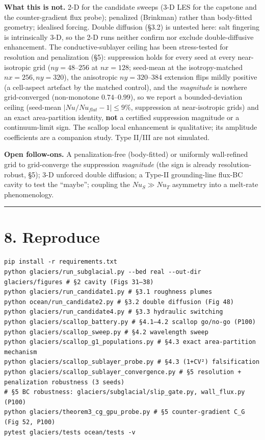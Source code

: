 \documentclass[11pt]{article}
\begin{document}
\textbf{What this is not.} 2-D for the candidate sweeps (3-D LES for the capstone and the counter-gradient flux probe); penalized (Brinkman) rather than body-fitted geometry; idealised forcing. Double diffusion (§3.2) is untested here: salt fingering is intrinsically 3-D, so the 2-D runs neither confirm nor exclude double-diffusive enhancement. The conductive-sublayer ceiling has been stress-tested for resolution and penalization (§5): suppression holds for every seed at every near-isotropic grid ($ny=48–256$ at $nx=128$; seed-mean at the isotropy-matched $nx=256, ny=320$), the anisotropic $ny=320–384$ extension flips mildly positive (a cell-aspect artefact by the matched control), and the \emph{magnitude} is nowhere grid-converged (non-monotone $0.74–0.99$), so we report a bounded-deviation ceiling (seed-mean $|Nu/Nu_{flat}-1|\le 9\%$, suppression at near-isotropic grids) and an exact area-partition identity, \textbf{not} a certified suppression magnitude or a continuum-limit sign. The scallop local enhancement is qualitative; its amplitude coefficients are a companion study. Type II/III are not simulated.


\textbf{Open follow-ons.} A penalization-free (body-fitted) or uniformly wall-refined grid to grid-converge the suppression \emph{magnitude} (the sign is already resolution-robust, §5); 3-D unforced double diffusion; a Type-II grounding-line flux-BC cavity to test the ``maybe''; coupling the $Nu_{S}\gg Nu_{T}$ asymmetry into a melt-rate phenomenology.


\medskip\hrule\medskip


\section*{8. Reproduce}


\begin{Verbatim}
pip install -r requirements.txt
python glaciers/run_subglacial.py --bed real --out-dir glaciers/figures # §2 cavity (Figs 31–38)
python glaciers/run_candidate1.py # §3.1 roughness plumes
python ocean/run_candidate2.py # §3.2 double diffusion (Fig 48)
python glaciers/run_candidate4.py # §3.3 hydraulic switching
python glaciers/scallop_battery.py # §4.1–4.2 scallop go/no-go (P100)
python glaciers/scallop_sweep.py # §4.2 wavelength sweep
python glaciers/scallop_g1_populations.py # §4.3 exact area-partition mechanism
python glaciers/scallop_sublayer_probe.py # §4.3 (1+CV²) falsification
python glaciers/scallop_sublayer_convergence.py # §5 resolution + penalization robustness (3 seeds)
# §5 BC robustness: glaciers/subglacial/slip_gate.py, wall_flux.py (P100)
python glaciers/theorem3_cg_gpu_probe.py # §5 counter-gradient C_G (Fig 52, P100)
pytest glaciers/tests ocean/tests -v
\end{Verbatim}
\end{document}
